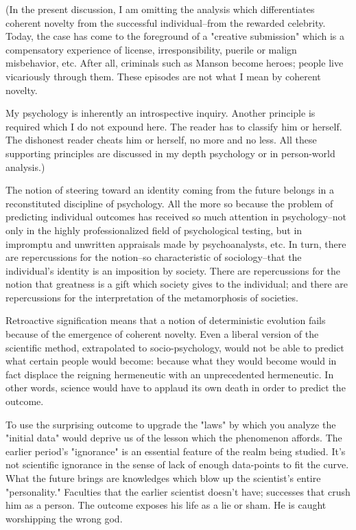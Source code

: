 \begin{enumerate}[label=\alph*.]
(In the present discussion, I am omitting the analysis which differentiates coherent novelty from the successful individual–from the rewarded celebrity. Today, the case has come to the foreground of a "creative submission" which is a compensatory experience of license, irresponsibility, puerile or malign misbehavior, etc. After all, criminals such as Manson become heroes; people live vicariously through them. These episodes are not what I mean by coherent novelty.

My psychology is inherently an introspective inquiry. Another principle is required which I do not expound here. The reader has to classify him or herself. The dishonest reader cheats him or herself, no more and no less. All these supporting principles are discussed in my depth psychology or in person-world analysis.)

The notion of steering toward an identity coming from the future belongs in a reconstituted discipline of psychology. All the more so because the problem of predicting individual outcomes has received so much attention in psychology–not only in the highly professionalized field of psychological testing, but in impromptu and unwritten appraisals made by psychoanalysts, etc. In turn, there are repercussions for the notion–so characteristic of sociology–that the individual’s identity is an imposition by society. There are repercussions for the notion that greatness is a gift which society gives to the individual; and there are repercussions for the interpretation of the metamorphosis of societies.

Retroactive signification means that a notion of deterministic evolution fails because of the emergence of coherent novelty. Even a liberal version of the scientific method, extrapolated to socio-psychology, would not be able to predict what certain people would become: because what they would become would in fact displace the reigning hermeneutic with an unprecedented hermeneutic. In other words, science would have to applaud its own death in order to predict the outcome.

To use the surprising outcome to upgrade the "laws" by which you analyze the "initial data" would deprive us of the lesson which the phenomenon affords. The earlier period’s "ignorance" is an essential feature of the realm being studied. It’s not scientific ignorance in the sense of lack of enough data-points to fit the curve. What the future brings are knowledges which blow up the scientist’s entire "personality." Faculties that the earlier scientist doesn’t have; successes that crush him as a person. The outcome exposes his life as a lie or sham. He is caught worshipping the wrong god.


\end{enumerate}
